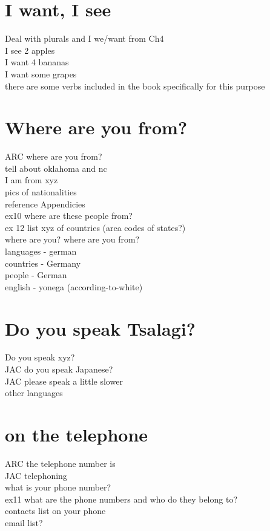 \chapter{I want, I see}
Deal with plurals and I we/want from Ch4\\
I see 2 apples\\
I want 4 bananas\\
I want some grapes\\
there are some verbs included in the book specifically for this purpose\\
\chapter{Where are you from?}
ARC where are you from?\\
tell about oklahoma and nc\\
I am from xyz\\
pics of nationalities\\
reference Appendicies\\
ex10 where are these people from?\\
ex 12 list xyz of countries (area codes of states?)\\
where are you?  where are you from?\\
languages - german\\
countries - Germany\\
people - German\\
english - yonega (according-to-white)\\
\chapter{Do you speak Tsalagi?}
Do you speak xyz?\\
JAC do you speak Japanese?\\
JAC please speak a little slower\\
other languages\\
\chapter{on the telephone}
ARC the telephone number is\\
JAC telephoning\\
what is your phone number?\\
ex11 what are the phone numbers and who do they belong to?\\
contacts list on your phone\\
email list?\\

